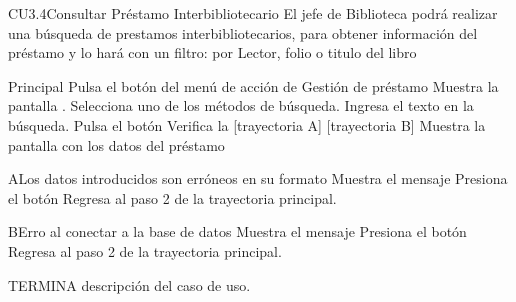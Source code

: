 
	\begin{UseCase}{CU3.4}{Consultar Préstamo Interbibliotecario}{
		El jefe de Biblioteca podrá realizar una búsqueda de prestamos interbibliotecarios, para obtener información del préstamo y lo hará con un filtro: por Lector, folio o titulo del libro
	}
	\end{UseCase}
	\begin{UCtrayectoria}{Principal}
		\UCpaso[\UCactor] Pulsa el botón  del menú de acción de Gestión de préstamo
		\UCpaso[\UCsist]Muestra la pantalla .
		\UCpaso[\UCactor]Selecciona uno de los métodos de búsqueda.
		\UCpaso[\UCactor]Ingresa el texto en la búsqueda.
		\UCpaso[\UCactor]Pulsa el botón 
		\UCpaso[\UCactor]Verifica la  [trayectoria A] [trayectoria B]
		\UCpaso[\UCsist] Muestra la pantalla  con los datos del préstamo
	\end{UCtrayectoria}
		\begin{UCtrayectoriaA}{A}{Los datos introducidos son erróneos en su formato}
			\UCpaso[\UCsist] Muestra el mensaje 
			\UCpaso[\UCactor] Presiona el botón 
			\UCpaso[\UCsist] Regresa al paso 2 de la trayectoria principal.
		\end{UCtrayectoriaA}


		\begin{UCtrayectoriaA}{B}{Erro al conectar a la base de datos}
			\UCpaso[\UCsist] Muestra el mensaje 
			\UCpaso[\UCactor] Presiona el botón 
			\UCpaso[\UCsist] Regresa al paso 2 de la trayectoria principal.
		\end{UCtrayectoriaA}
		
TERMINA descripción del caso de uso.


